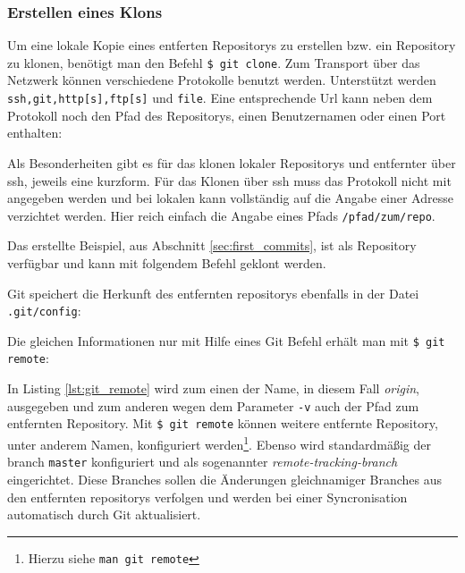 \subsubsection{Erstellen eines Klons}\label{sec:gitclone}
Um eine lokale Kopie eines entferten Repositorys zu erstellen bzw. ein
Repository zu klonen, benötigt man den Befehl \texttt{\$ git clone}. Zum
Transport über das Netzwerk können verschiedene Protokolle benutzt werden.
Unterstützt werden \texttt{ssh,git,http[s],ftp[s]} und \texttt{file}. Eine
entsprechende Url kann neben dem Protokoll noch den Pfad des Repositorys, einen
Benutzernamen oder einen Port enthalten:



Als Besonderheiten gibt es für das klonen lokaler Repositorys und entfernter
über \gls{ssh}, jeweils eine kurzform. Für das Klonen über \gls{ssh} muss das
Protokoll nicht mit angegeben werden und bei lokalen kann vollständig auf die
Angabe einer Adresse verzichtet werden. Hier reich einfach die Angabe eines
Pfads \texttt{/pfad/zum/repo}.

Das erstellte Beispiel, aus Abschnitt \ref{sec:first_commits}, ist als
Repository verfügbar und kann mit folgendem Befehl geklont werden.



Git speichert die Herkunft des entfernten \glspl{repository} ebenfalls in der
Datei \texttt{.git/config}:



Die gleichen Informationen nur mit Hilfe eines Git Befehl erhält man mit
\texttt{\$ git remote}:



In Listing \ref{lst:git_remote} wird zum einen der Name, in diesem Fall
\textit{origin}, ausgegeben und zum anderen wegen dem Parameter \texttt{-v}
auch der Pfad zum entfernten Repository. Mit \texttt{\$ git remote} können
weitere entfernte Repository, unter anderem Namen, konfiguriert
werden\footnote{Hierzu siehe \texttt{man git remote}}. Ebenso wird
standardmäßig der \gls{branch} \texttt{master} konfiguriert und als sogenannter
\textit{remote-tracking-branch} eingerichtet. Diese Branches sollen die
Änderungen gleichnamiger Branches aus den entfernten \glspl{repository}
verfolgen und werden bei einer Syncronisation automatisch durch Git
aktualisiert.\cite[S.~141-143]{gitosp}


